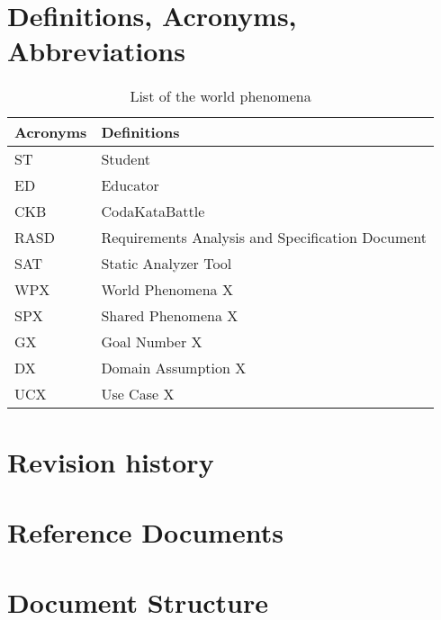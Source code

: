 \section{Definitions, Acronyms, Abbreviations}
\label{s:Definitions_Acronyms_Abbreviations}%

\begin{table}[H]
  \begin{tabular}{|l|l|}

    \hline
    \textbf{Acronyms} & \textbf{Definitions}      \\
    \hline
    ST & Student \\
    \hline
    ED & Educator \\
    \hline
    CKB & CodaKataBattle \\
    \hline
    RASD & Requirements Analysis and Specification Document     \\
    \hline
    SAT & Static Analyzer Tool    \\
    \hline
    WPX & World Phenomena X    \\
    \hline
    SPX & Shared Phenomena X    \\
    \hline
    GX & Goal Number X    \\
    \hline
    DX & Domain Assumption X    \\
    \hline
    UCX & Use Case X    \\
    \hline
  \end{tabular}
  \caption{List of the world phenomena}
  \label{tab:definitions}
\end{table}

\section{Revision history}
\label{s:Revision_history}%


\section{Reference Documents}
\label{s:Reference_documents}%

\section{Document Structure}
\label{s:Document_Structure}%
